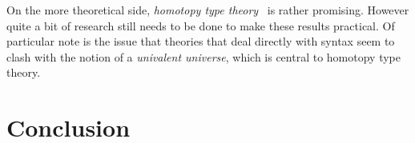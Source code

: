\documentclass[fleqn]{llncs}
\begin{document}
On the more theoretical side, \emph{homotopy type theory}~\cite{hottbook}
is rather promising.  However quite a bit of research still needs to be
done to make these results practical. Of particular note is the issue
that theories that deal directly with syntax seem to clash with the
notion of a \emph{univalent universe}, which is central to homotopy
type theory.

\section{Conclusion}




\end{document}
